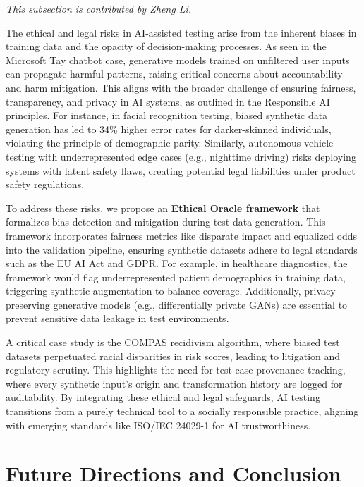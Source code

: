 \documentclass[manuscript,screen,review]{acmart}
\begin{document}
\textit{This subsection is contributed by Zheng Li.}

The ethical and legal risks in AI-assisted testing arise from the inherent biases in training data and the opacity of decision-making processes. As seen in the Microsoft Tay chatbot case, generative models trained on unfiltered user inputs can propagate harmful patterns, raising critical concerns about accountability and harm mitigation. This aligns with the broader challenge of ensuring fairness, transparency, and privacy in AI systems, as outlined in the Responsible AI principles\cite{Zhou2024}. For instance, in facial recognition testing, biased synthetic data generation has led to 34\% higher error rates for darker-skinned individuals, violating the principle of demographic parity. Similarly, autonomous vehicle testing with underrepresented edge cases (e.g., nighttime driving) risks deploying systems with latent safety flaws, creating potential legal liabilities under product safety regulations.

To address these risks, we propose an \textbf{Ethical Oracle framework} that formalizes bias detection and mitigation during test data generation. This framework incorporates fairness metrics like disparate impact and equalized odds into the validation pipeline, ensuring synthetic datasets adhere to legal standards such as the EU AI Act and GDPR. For example, in healthcare diagnostics, the framework would flag underrepresented patient demographics in training data, triggering synthetic augmentation to balance coverage. Additionally, privacy-preserving generative models (e.g., differentially private GANs) are essential to prevent sensitive data leakage in test environments.

A critical case study is the COMPAS recidivism algorithm, where biased test datasets perpetuated racial disparities in risk scores, leading to litigation and regulatory scrutiny. This highlights the need for test case provenance tracking, where every synthetic input’s origin and transformation history are logged for auditability. By integrating these ethical and legal safeguards, AI testing transitions from a purely technical tool to a socially responsible practice, aligning with emerging standards like ISO/IEC 24029-1 for AI trustworthiness.

\section{Future Directions and Conclusion}
\end{document}
